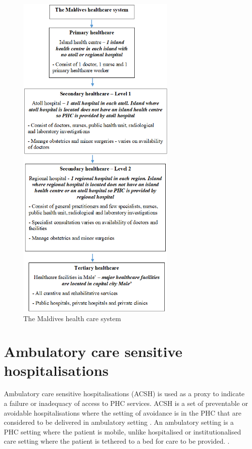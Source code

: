 \begin{figure}[H]
\caption{The Maldives health care system}
\label{MHS}
\centering
\includegraphics[width=0.70\textwidth]{MaldivesHS.png}
\end{figure}

\section{Ambulatory care sensitive hospitalisations} 

Ambulatory care sensitive hospitalisations (ACSH) is used as a proxy to indicate a failure or inadequacy of access to PHC services. ACSH is a set of preventable or avoidable hospitalisations where the setting of avoidance is in the PHC that are considered to be delivered in ambulatory setting \cite{barker2016pathways}. An ambulatory setting is a PHC setting where the patient is mobile, unlike hospitalised or institutionalised care setting where the patient is tethered to a bed for care to be provided.
 \cite{WHO:assess:acsh, magan2011hospitalizations,billings1990uninsured}.  
 
